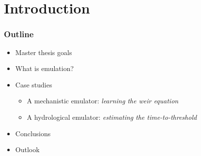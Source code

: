 \documentclass[xcolor=dvipsnames, USenglish]{beamer}  %
\begin{document}
\section{Introduction}

  \begin{frame}
    \frametitle{Outline}
    \begin{itemize}
      \item Master thesis goals
      \item What is emulation?
      \item Case studies
      \begin{itemize}
        \item A mechanistic emulator: \emph{learning the weir equation}
        \item A hydrological emulator: \emph{estimating the time-to-threshold}
      \end{itemize}
      \item Conclusions
      \item Outlook
     \end{itemize}
  \end{frame}

\end{document}
